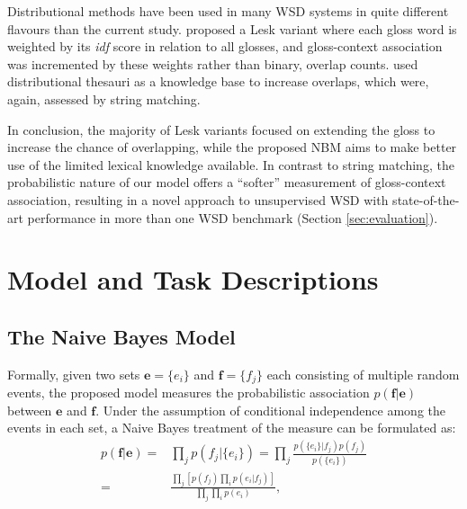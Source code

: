 \documentclass[11pt]{article}
\begin{document}
Distributional methods have been used in many WSD systems in quite
different flavours than the current
study. \citet{kilgarriff2000framework} proposed a Lesk variant where
each gloss word is weighted by its \textit{idf} score in relation to
all glosses, and gloss-context association was incremented by these
weights rather than binary, overlap counts. \citet{miller2012using}
used distributional thesauri as a knowledge base to increase overlaps,
which were, again, assessed by string matching.

In conclusion, the majority of Lesk variants focused on extending the
gloss to increase the chance of overlapping, while the proposed NBM
aims to make better use of the limited lexical knowledge available. In
contrast to string matching, the probabilistic nature of our model
offers a ``softer'' measurement of gloss-context association,
resulting in a novel approach to unsupervised WSD with
state-of-the-art performance in more than one WSD benchmark (Section
\ref{sec:evaluation}).

\section{Model and Task Descriptions}
\label{sec:softlesk-using-nbm}
\subsection{The Naive Bayes Model}
\label{sec:prob-model}
Formally, given two sets $\mathbf{e}=\{e_i\}$ and $\mathbf{f}=\{f_j\}$
each consisting of multiple random events, the proposed model measures
the probabilistic association $p(\mathbf{f}|\mathbf{e})$ between
$\mathbf{e}$ and $\mathbf{f}$. Under the assumption of conditional
independence among the events in each set, a Naive Bayes treatment of
the measure can be formulated as:
\begin{equation}
  \label{eq:nbm}
\begin{aligned}
  p(\mathbf{f}|\mathbf{e})
  =&\prod_jp(f_j|\{e_i\})=\prod_j\frac{p(\{e_i\}|f_j)p(f_j)}{p(\{e_i\})}\\
=&\frac{\prod_j[p(f_j)\prod_ip(e_i|f_j)]}{\prod_j\prod_ip(e_i)},
\end{aligned}
\end{equation}

\end{document}
